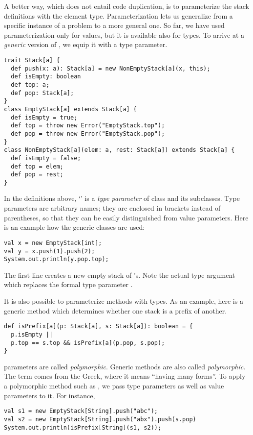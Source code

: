 A better way, which does not entail code duplication, is to
parameterize the stack definitions with the element type.
Parameterization lets us generalize from a specific instance of a
problem to a more general one. So far, we have used parameterization
only for values, but it is available also for types. To arrive at a
{\em generic} version of , we equip it with a type
parameter.
\begin{lstlisting}
trait Stack[a] {
  def push(x: a): Stack[a] = new NonEmptyStack[a](x, this);
  def isEmpty: boolean
  def top: a;
  def pop: Stack[a];
}
class EmptyStack[a] extends Stack[a] {
  def isEmpty = true;
  def top = throw new Error("EmptyStack.top");
  def pop = throw new Error("EmptyStack.pop");
}
class NonEmptyStack[a](elem: a, rest: Stack[a]) extends Stack[a] {
  def isEmpty = false;
  def top = elem;
  def pop = rest;
}
\end{lstlisting}
In the definitions above, `' is a {\em type parameter} of
class  and its subclasses.  Type parameters are arbitrary
names; they are enclosed in brackets instead of parentheses, so that
they can be easily distinguished from value parameters.  Here is an
example how the generic classes are used:
\begin{lstlisting}
val x = new EmptyStack[int];
val y = x.push(1).push(2);
System.out.println(y.pop.top);
\end{lstlisting}
The first line creates a new empty stack of 's. Note the
actual type argument \code{[int]} which replaces the formal type
parameter .

It is also possible to parameterize methods with types. As an example,
here is a generic method which determines whether one stack is a
prefix of another.
\begin{lstlisting}
def isPrefix[a](p: Stack[a], s: Stack[a]): boolean = {
  p.isEmpty ||
  p.top == s.top && isPrefix[a](p.pop, s.pop);
}
\end{lstlisting}  
parameters are called {\em polymorphic}.  Generic methods are also
called {\em polymorphic}.  The term comes from the Greek, where it
means ``having many forms''.  To apply a polymorphic method such as
, we pass type parameters as well as value parameters
to it. For instance,
\begin{lstlisting}
val s1 = new EmptyStack[String].push("abc");
val s2 = new EmptyStack[String].push("abx").push(s.pop)
System.out.println(isPrefix[String](s1, s2));
\end{lstlisting}

